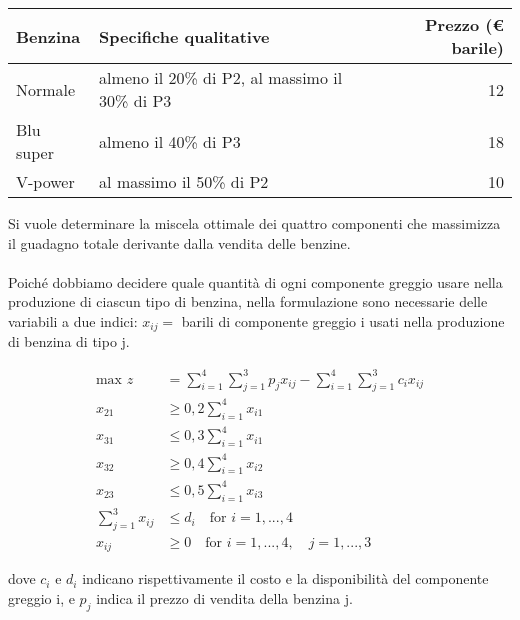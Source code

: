 \documentclass[a4paper, 11pt]{article}
\begin{document}
            \begin{table}[ht]
                \centering
                \begin{tabular}{|l|l|r|}
                \hline
                \textbf{Benzina} & \textbf{Specifiche qualitative} & \textbf{Prezzo (€ barile)} \\ \hline
                Normale          & almeno il 20\% di P2, al massimo il 30\% di P3 & 12 \\ 
                Blu super        & almeno il 40\% di P3                          & 18 \\ 
                V-power          & al massimo il 50\% di P2                     & 10 \\ \hline
                \end{tabular}
            \end{table}

            Si vuole determinare la miscela ottimale dei quattro componenti che massimizza il guadagno
            totale derivante dalla vendita delle benzine.

            \paragraph{}
            Poiché dobbiamo decidere quale quantità di ogni componente greggio usare nella produzione di ciascun tipo di benzina, nella formulazione sono necessarie delle variabili a due indici: $x_{ij}=$ barili di componente greggio i usati nella produzione di benzina di tipo j.
            
            \begin{align*}
                \text{max } z &= \sum_{i=1}^{4} \sum_{j=1}^{3} p_j x_{ij} - \sum_{i=1}^{4} \sum_{j=1}^{3} c_i x_{ij} \\
                x_{21} &\geq 0,2 \sum_{i=1}^{4} x_{i1} \\
                x_{31} &\leq 0,3 \sum_{i=1}^{4} x_{i1} \\
                x_{32} &\geq 0,4 \sum_{i=1}^{4} x_{i2} \\
                x_{23} &\leq 0,5 \sum_{i=1}^{4} x_{i3} \\
                \sum_{j=1}^{3} x_{ij} &\le d_i \quad \text{for } i = 1, ..., 4 \\
                x_{ij} &\ge 0 \quad \text{for } i = 1, ..., 4, \quad j = 1, ..., 3
            \end{align*}
            
            dove $c_i$ e $d_i$ indicano rispettivamente il costo e la disponibilità del componente greggio i, e $p_j$
            indica il prezzo di vendita della benzina j.
\end{document}
